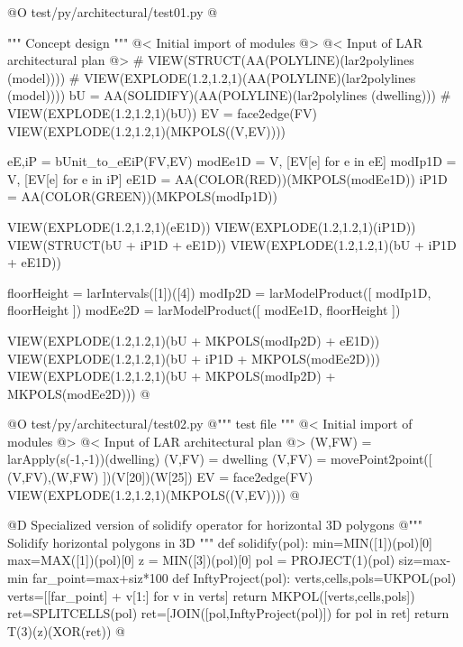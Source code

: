 \documentclass[11pt,oneside]{article}    %
\begin{document}
@O test/py/architectural/test01.py
@{""" Concept design """
@< Initial import of modules @>
@< Input of LAR architectural plan @>
# VIEW(STRUCT(AA(POLYLINE)(lar2polylines (model))))
# VIEW(EXPLODE(1.2,1.2,1)(AA(POLYLINE)(lar2polylines (model))))
bU = AA(SOLIDIFY)(AA(POLYLINE)(lar2polylines (dwelling)))
# VIEW(EXPLODE(1.2,1.2,1)(bU))
EV = face2edge(FV)
VIEW(EXPLODE(1.2,1.2,1)(MKPOLS((V,EV))))

eE,iP = bUnit_to_eEiP(FV,EV)
modEe1D = V, [EV[e] for e in eE]
modIp1D = V, [EV[e] for e in iP]
eE1D = AA(COLOR(RED))(MKPOLS(modEe1D))
iP1D = AA(COLOR(GREEN))(MKPOLS(modIp1D))

VIEW(EXPLODE(1.2,1.2,1)(eE1D))
VIEW(EXPLODE(1.2,1.2,1)(iP1D))
VIEW(STRUCT(bU + iP1D + eE1D))
VIEW(EXPLODE(1.2,1.2,1)(bU + iP1D + eE1D))

floorHeight = larIntervals([1])([4])
modIp2D = larModelProduct([ modIp1D, floorHeight ])
modEe2D = larModelProduct([ modEe1D, floorHeight ])

VIEW(EXPLODE(1.2,1.2,1)(bU + MKPOLS(modIp2D) + eE1D))
VIEW(EXPLODE(1.2,1.2,1)(bU + iP1D + MKPOLS(modEe2D)))
VIEW(EXPLODE(1.2,1.2,1)(bU + MKPOLS(modIp2D) + MKPOLS(modEe2D)))
@}



@O test/py/architectural/test02.py
@{""" test file """
@< Initial import of modules @>
@< Input of LAR architectural plan @>
(W,FW) = larApply(s(-1,-1))(dwelling)
(V,FV) = dwelling
(V,FV) = movePoint2point([ (V,FV),(W,FW) ])(V[20])(W[25])
EV = face2edge(FV)
VIEW(EXPLODE(1.2,1.2,1)(MKPOLS((V,EV))))
@}



@D Specialized version of solidify operator for horizontal 3D polygons
@{""" Solidify horizontal polygons in 3D """
def solidify(pol):    
    min=MIN([1])(pol)[0]
    max=MAX([1])(pol)[0]
    z = MIN([3])(pol)[0]
    pol = PROJECT(1)(pol)
    siz=max-min
    far_point=max+siz*100 
    def InftyProject(pol):
        verts,cells,pols=UKPOL(pol)
        verts=[[far_point] + v[1:] for v in verts]
        return MKPOL([verts,cells,pols])  
    ret=SPLITCELLS(pol)
    ret=[JOIN([pol,InftyProject(pol)]) for pol in ret]
    return T(3)(z)(XOR(ret))
@}
\end{document}
